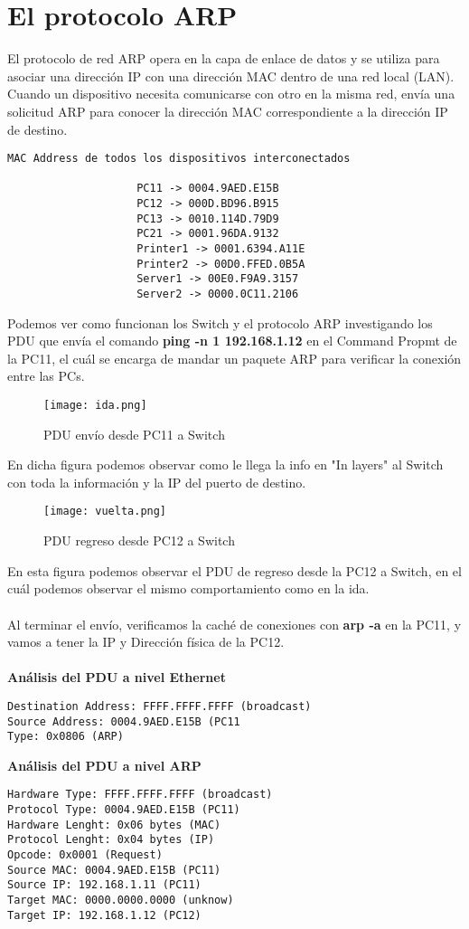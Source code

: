 \documentclass{article}
\begin{document}
\section{El protocolo ARP}
El protocolo de red ARP opera en la capa de enlace de datos y se utiliza para asociar una dirección IP con una dirección MAC dentro de una red local (LAN). Cuando un dispositivo necesita comunicarse con otro en la misma red, envía una solicitud ARP para conocer la dirección MAC correspondiente a la dirección IP de destino.

\begin{lstlisting}
MAC Address de todos los dispositivos interconectados
                           
                    PC11 -> 0004.9AED.E15B
                    PC12 -> 000D.BD96.B915
                    PC13 -> 0010.114D.79D9
                    PC21 -> 0001.96DA.9132
                    Printer1 -> 0001.6394.A11E
                    Printer2 -> 00D0.FFED.0B5A
                    Server1 -> 00E0.F9A9.3157
                    Server2 -> 0000.0C11.2106
\end{lstlisting}
Podemos ver como funcionan los Switch y el protocolo ARP investigando los PDU que envía el comando \textbf{ping -n 1 192.168.1.12} en el Command Propmt de la PC11, el cuál se encarga de mandar un paquete ARP para verificar la conexión entre las PCs.
\begin{figure}[H]
    \centering
    \texttt{[image: ida.png]}
    \caption{PDU envío desde PC11 a Switch}
    \label{fig:enter-label}
\end{figure}
En dicha figura podemos observar como le llega la info en "In layers" al Switch con toda la información y la IP del puerto de destino.
\begin{figure}[H]
    \centering
    \texttt{[image: vuelta.png]}
    \caption{PDU regreso desde PC12 a Switch}
    \label{fig:enter-label}
\end{figure}
En esta figura podemos observar el PDU de regreso desde la PC12 a Switch, en el cuál podemos observar el mismo comportamiento como en la ida. 
\\\\
Al terminar el envío, verificamos la caché de conexiones con \textbf{arp -a} en la PC11, y vamos a tener la IP y Dirección física de la PC12.
\\\\
\textbf{Análisis del PDU a nivel Ethernet}
\begin{lstlisting}
Destination Address: FFFF.FFFF.FFFF (broadcast)
Source Address: 0004.9AED.E15B (PC11
Type: 0x0806 (ARP)
\end{lstlisting}
\textbf{Análisis del PDU a nivel ARP}
\begin{lstlisting}
Hardware Type: FFFF.FFFF.FFFF (broadcast)
Protocol Type: 0004.9AED.E15B (PC11)
Hardware Lenght: 0x06 bytes (MAC)
Protocol Lenght: 0x04 bytes (IP)
Opcode: 0x0001 (Request)
Source MAC: 0004.9AED.E15B (PC11)
Source IP: 192.168.1.11 (PC11)
Target MAC: 0000.0000.0000 (unknow)
Target IP: 192.168.1.12 (PC12)
\end{lstlisting}
\end{document}

